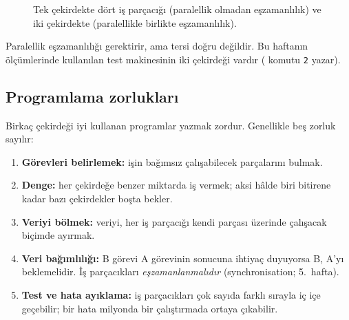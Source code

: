 \begin{figure}[H]
\centering
{}
\caption{Tek çekirdekte dört iş parçacığı (paralellik olmadan eşzamanlılık) ve iki çekirdekte (paralellikle birlikte eşzamanlılık).}
\end{figure}

Paralellik eşzamanlılığı gerektirir, ama tersi doğru değildir. Bu haftanın ölçümlerinde kullanılan test makinesinin iki çekirdeği vardır ( komutu \texttt{2} yazar).

\subsection{Programlama zorlukları}

Birkaç çekirdeği iyi kullanan programlar yazmak zordur. Genellikle beş zorluk sayılır:
\begin{enumerate}[leftmargin=1.4em]
  \item \textbf{Görevleri belirlemek:} işin bağımsız çalışabilecek parçalarını bulmak.
  \item \textbf{Denge:} her çekirdeğe benzer miktarda iş vermek; aksi hâlde biri bitirene kadar bazı çekirdekler boşta bekler.
  \item \textbf{Veriyi bölmek:} veriyi, her iş parçacığı kendi parçası üzerinde çalışacak biçimde ayırmak.
  \item \textbf{Veri bağımlılığı:} B görevi A görevinin sonucuna ihtiyaç duyuyorsa B, A'yı beklemelidir. İş parçacıkları \emph{eşzamanlanmalıdır} (synchronisation; 5.~hafta).
  \item \textbf{Test ve hata ayıklama:} iş parçacıkları çok sayıda farklı sırayla iç içe geçebilir; bir hata milyonda bir çalıştırmada ortaya çıkabilir.
\end{enumerate}

